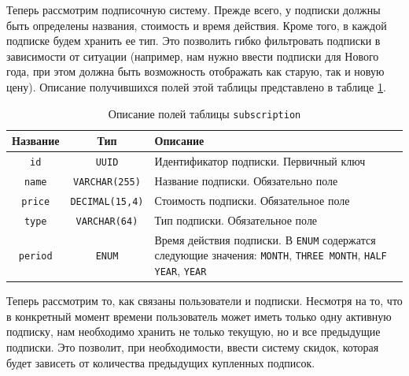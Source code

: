 \documentclass[a4paper,14pt]{extarticle}
\begin{document}
Теперь рассмотрим подписочную систему. Прежде всего, у подписки должны быть определены названия, стоимость и время действия. Кроме того, в каждой подписке будем хранить ее тип. Это позволить гибко фильтровать подписки в зависимости от ситуации (например, нам нужно ввести подписки для Нового года, при этом должна быть возможность отображать как старую, так и новую цену). Описание получившихся полей этой таблицы представлено в таблице \ref{tab:subscription}.

\begin{center}
    \begin{longtable}{|c|c|>{\centering\arraybackslash}m{9.8cm}|}
        \caption{Описание полей таблицы \texttt{subscription}}
        \label{tab:subscription}
        \\
        \hline
        \textbf{Название} & \textbf{Тип}           & \textbf{Описание}                                                                                                                               \\
        \hline
        \texttt{id}       & \texttt{UUID}          & Идентификатор подписки. Первичный ключ                                                                                                          \\
        \hline
        \texttt{name}     & \texttt{VARCHAR(255)}  & Название подписки. Обязательно поле                                                                                                             \\
        \hline
        \texttt{price}    & \texttt{DECIMAL(15,4)} & Стоимость подписки. Обязательное поле                                                                                                           \\
        \hline
        \texttt{type}     & \texttt{VARCHAR(64)}   & Тип подписки. Обязательное поле                                                                                                                 \\
        \hline
        \texttt{period}   & \texttt{ENUM}          & Время действия подписки. В \texttt{ENUM} содержатся следующие значения: \texttt{MONTH}, \texttt{THREE MONTH}, \texttt{HALF YEAR}, \texttt{YEAR} \\
        \hline
    \end{longtable}
\end{center}

Теперь рассмотрим то, как связаны пользователи и подписки. Несмотря на то, что в конкретный момент времени пользователь может иметь только одну активную подписку, нам необходимо хранить не только текущую, но и все предыдущие подписки. Это позволит, при необходимости, ввести систему скидок, которая будет зависеть от количества предыдущих купленных подписок.
\end{document}
